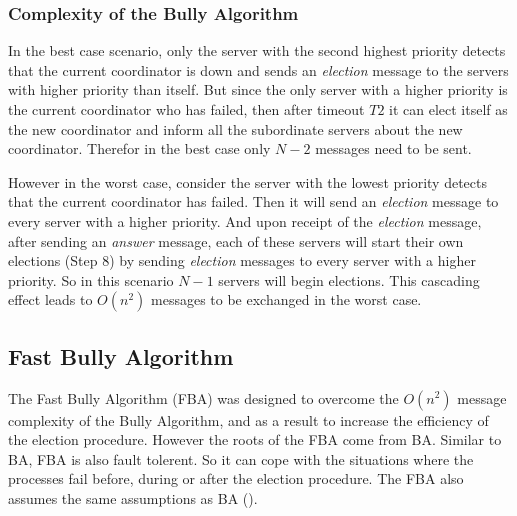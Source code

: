 \documentclass[dareport.tex]{subfiles}
\begin{document}
\subsubsection{Complexity of the Bully Algorithm}\label{sssec:ba-complexity}
In the best case scenario, only the server with the second highest priority detects that the current coordinator is down and sends an \emph{election} message to the servers with higher priority than itself. But since the only server with a higher priority is the current coordinator who has failed, then after timeout $ T2 $ it can elect itself as the new coordinator and inform all the subordinate servers about the new coordinator. Therefor in the best case only $ N-2 $ messages need to be sent.

However in the worst case, consider the server with the lowest priority detects that the current coordinator has failed. Then it will send an \emph{election} message to every server with a higher priority. And upon receipt of the \emph{election} message, after sending an \emph{answer} message, each of these servers will start their own elections (Step 8) by sending \emph{election} messages to every server with a higher priority. So in this scenario $ N-1 $ servers will begin elections. This cascading effect leads to $ O(n^2) $ messages to be exchanged in the worst case.

\subsection{Fast Bully Algorithm} \label{ssec:fast-bully}
The Fast Bully Algorithm (FBA)\cite{fastbully} was designed to overcome the $ O(n^2) $ message complexity of the Bully Algorithm, and as a result to increase the efficiency of the election procedure. However the roots of the FBA come from BA. Similar to BA, FBA is also fault tolerent. So it can cope with the situations where the processes fail before, during or after the election procedure. The FBA also assumes the same assumptions as BA ().
\end{document}
